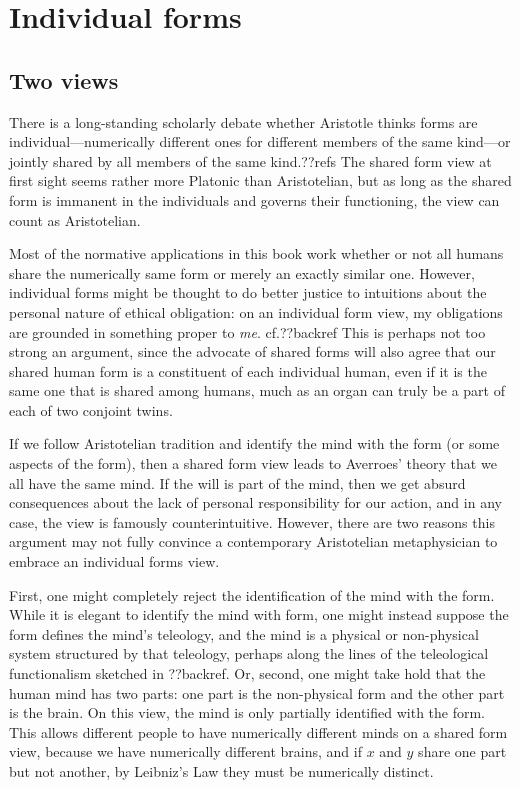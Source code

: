 \section{Individual forms}
\subsection{Two views}
There is a long-standing scholarly debate whether Aristotle thinks forms are individual---numerically different ones for different members of 
the same kind---or jointly shared by all members of the same kind.??refs The shared form view at first sight seems rather 
more Platonic than Aristotelian, but as long as the shared form is immanent in the individuals and governs their functioning,
the view can count as Aristotelian. 

Most of the normative applications in this book work whether or not all humans share the numerically same form or merely 
an exactly similar one. However, individual forms might be thought to do better justice to intuitions about the personal 
nature of ethical obligation: on an individual form view, my obligations are grounded in something proper to \textit{me}. cf.??backref This is perhaps not too strong an argument, since the advocate of shared forms will also agree that our 
shared human form is a constituent of each individual human, even if it is the same one that is shared among humans, much 
as an organ can truly be a part of each of two conjoint twins. 

If we follow Aristotelian tradition and identify the mind with the form (or some aspects of the form), then a shared form 
view leads to Averroes' theory that we all have the same mind. If the will is part of the mind, then we get absurd consequences
about the lack of personal responsibility for our action, and in any case, the view is famously counterintuitive. However, 
there are two reasons this argument may not fully convince a contemporary Aristotelian metaphysician to embrace an individual
forms view. 

First, one might completely reject the identification of the mind with the form. While it is elegant to identify the mind with 
form, one might instead suppose the form defines the mind's teleology, and the mind is a physical or non-physical system 
structured by that teleology, perhaps along the lines of the teleological functionalism sketched in ??backref. Or, second,
one might take hold that the human mind has two parts: one part is the non-physical form and the other part is the brain.
On this view, the mind is only partially identified with the form. This allows different people to have numerically different
minds on a shared form view, because we have numerically different brains, and if $x$ and $y$ share one part but not another,
by Leibniz's Law they must be numerically distinct. 

